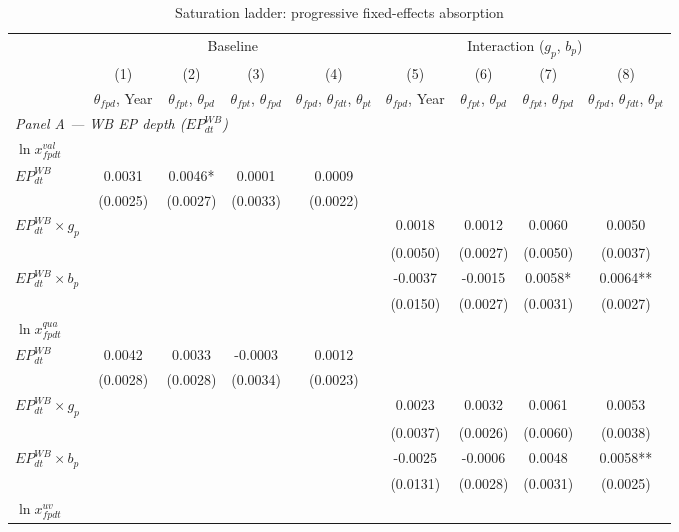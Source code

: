 \begin{table}[htbp]
\centering
\footnotesize
\caption{Saturation ladder: progressive fixed-effects absorption}
\label{tab:saturation_ladder}
\begin{threeparttable}
\begin{tabular}{lcccccccc}
\toprule
 & \multicolumn{4}{c}{Baseline} & \multicolumn{4}{c}{Interaction ($g_p$, $b_p$)} \\
\cmidrule(lr){2-5}\cmidrule(lr){6-9}
 & (1) & (2) & (3) & (4) & (5) & (6) & (7) & (8) \\
 & $\theta_{fpd}$, Year & $\theta_{fpt}$, $\theta_{pd}$ & $\theta_{fpt}$, $\theta_{fpd}$ & $\theta_{fpd}$, $\theta_{fdt}$, $\theta_{pt}$ & $\theta_{fpd}$, Year & $\theta_{fpt}$, $\theta_{pd}$ & $\theta_{fpt}$, $\theta_{fpd}$ & $\theta_{fpd}$, $\theta_{fdt}$, $\theta_{pt}$ \\
\midrule
\multicolumn{9}{l}{\textit{Panel A --- WB EP depth ($EP^{WB}_{dt}$)}} \\[3pt]
\multicolumn{9}{l}{\quad $\ln x^{val}_{fpdt}$} \\
\quad $EP^{WB}_{dt}$ & 0.0031 & 0.0046* & 0.0001 & 0.0009 &  &  &  &  \\
 & (0.0025) & (0.0027) & (0.0033) & (0.0022) &  &  &  &  \\
\quad $EP^{WB}_{dt} \times g_p$ &  &  &  &  & 0.0018 & 0.0012 & 0.0060 & 0.0050 \\
 &  &  &  &  & (0.0050) & (0.0027) & (0.0050) & (0.0037) \\
\quad $EP^{WB}_{dt} \times b_p$ &  &  &  &  & -0.0037 & -0.0015 & 0.0058* & 0.0064** \\
 &  &  &  &  & (0.0150) & (0.0027) & (0.0031) & (0.0027) \\[3pt]
\multicolumn{9}{l}{\quad $\ln x^{qua}_{fpdt}$} \\
\quad $EP^{WB}_{dt}$ & 0.0042 & 0.0033 & -0.0003 & 0.0012 &  &  &  &  \\
 & (0.0028) & (0.0028) & (0.0034) & (0.0023) &  &  &  &  \\
\quad $EP^{WB}_{dt} \times g_p$ &  &  &  &  & 0.0023 & 0.0032 & 0.0061 & 0.0053 \\
 &  &  &  &  & (0.0037) & (0.0026) & (0.0060) & (0.0038) \\
\quad $EP^{WB}_{dt} \times b_p$ &  &  &  &  & -0.0025 & -0.0006 & 0.0048 & 0.0058** \\
 &  &  &  &  & (0.0131) & (0.0028) & (0.0031) & (0.0025) \\[3pt]
\multicolumn{9}{l}{\quad $\ln x^{uv}_{fpdt}$} \\

\end{tabular}
\end{threeparttable}
\end{table}
